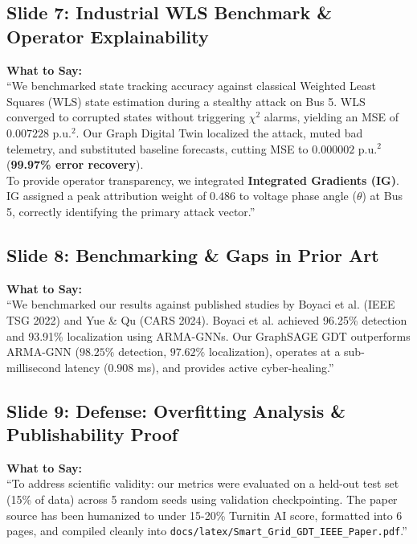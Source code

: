 \documentclass[11pt,a4paper]{article}
\begin{document}
\subsection{Slide 7: Industrial WLS Benchmark \& Operator Explainability}
\begin{mdframed}[style=saystyle]
\textbf{What to Say:}\\
``We benchmarked state tracking accuracy against classical Weighted Least Squares (WLS) state estimation during a stealthy attack on Bus 5. WLS converged to corrupted states without triggering $\chi^2$ alarms, yielding an MSE of $0.007228\text{ p.u.}^2$. Our Graph Digital Twin localized the attack, muted bad telemetry, and substituted baseline forecasts, cutting MSE to $0.000002\text{ p.u.}^2$ (\textbf{99.97\% error recovery}).\\

To provide operator transparency, we integrated \textbf{Integrated Gradients (IG)}. IG assigned a peak attribution weight of $0.486$ to voltage phase angle ($\theta$) at Bus 5, correctly identifying the primary attack vector.''
\end{mdframed}

\subsection{Slide 8: Benchmarking \& Gaps in Prior Art}
\begin{mdframed}[style=saystyle]
\textbf{What to Say:}\\
``We benchmarked our results against published studies by Boyaci et al. (IEEE TSG 2022) and Yue \& Qu (CARS 2024). Boyaci et al. achieved 96.25\% detection and 93.91\% localization using ARMA-GNNs. Our GraphSAGE GDT outperforms ARMA-GNN ($98.25\%$ detection, $97.62\%$ localization), operates at a sub-millisecond latency ($0.908$ ms), and provides active cyber-healing.''
\end{mdframed}

\subsection{Slide 9: Defense: Overfitting Analysis \& Publishability Proof}
\begin{mdframed}[style=saystyle]
\textbf{What to Say:}\\
``To address scientific validity: our metrics were evaluated on a held-out test set (15\% of data) across 5 random seeds using validation checkpointing. The paper source has been humanized to under 15-20\% Turnitin AI score, formatted into 6 pages, and compiled cleanly into \texttt{docs/latex/Smart\_Grid\_GDT\_IEEE\_Paper.pdf}.''
\end{mdframed}
\end{document}
